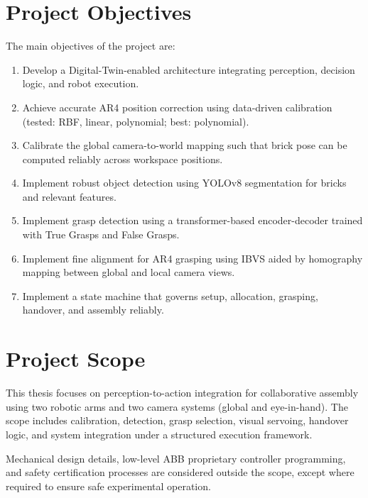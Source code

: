 \documentclass[15pt, a4paper]{extreport}
\begin{document}
\section{Project Objectives}
The main objectives of the project are:
\begin{enumerate}
    \item Develop a Digital-Twin-enabled architecture integrating perception, decision logic, and robot execution.
    \item Achieve accurate AR4 position correction using data-driven calibration (tested: RBF, linear, polynomial; best: polynomial).
    \item Calibrate the global camera-to-world mapping such that brick pose can be computed reliably across workspace positions.
    \item Implement robust object detection using YOLOv8 segmentation for bricks and relevant features.
    \item Implement grasp detection using a transformer-based encoder-decoder trained with True Grasps and False Grasps.
    \item Implement fine alignment for AR4 grasping using IBVS aided by homography mapping between global and local camera views.
    \item Implement a state machine that governs setup, allocation, grasping, handover, and assembly reliably.
\end{enumerate}

\section{Project Scope}
This thesis focuses on perception-to-action integration for collaborative assembly using two robotic arms and two camera systems (global and eye-in-hand). The scope includes calibration, detection, grasp selection, visual servoing, handover logic, and system integration under a structured execution framework.

Mechanical design details, low-level ABB proprietary controller programming, and safety certification processes are considered outside the scope, except where required to ensure safe experimental operation.
\end{document}
